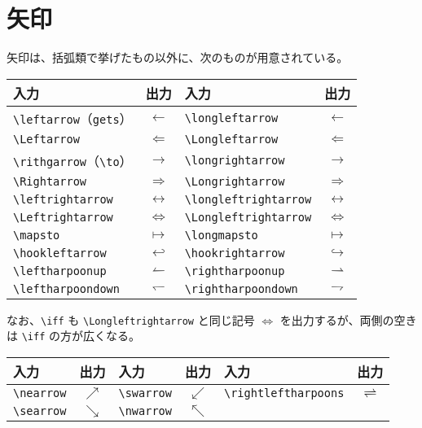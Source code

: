 \section{矢印}
矢印は、括弧類で挙げたもの以外に、次のものが用意されている。
\begin{longtable}{@{}lclc@{}}
    入力                             & 出力               & 入力                       & 出力                  \\ \toprule
    \verb`\leftarrow`（\verb`gets`） & $\leftarrow$       & \verb`\longleftarrow`      & $\longleftarrow$      \\
    \verb`\Leftarrow`                & $\Leftarrow$       & \verb`\Longleftarrow`      & $\Longleftarrow$      \\
    \verb`\rithgarrow`（\verb`\to`） & $\rightarrow$      & \verb`\longrightarrow`     & $\longrightarrow$     \\
    \verb`\Rightarrow`               & $\Rightarrow$      & \verb`\Longrightarrow`     & $\Longrightarrow$     \\
    \verb`\leftrightarrow`           & $\leftrightarrow$  & \verb`\longleftrightarrow` & $\longleftrightarrow$ \\
    \verb`\Leftrightarrow`           & $\Leftrightarrow$  & \verb`\Longleftrightarrow` & $\Longleftrightarrow$ \\
    \verb`\mapsto`                   & $\mapsto$          & \verb`\longmapsto`         & $\longmapsto$         \\
    \verb`\hookleftarrow`            & $\hookleftarrow$   & \verb`\hookrightarrow`     & $\hookrightarrow$     \\
    \verb`\leftharpoonup`            & $\leftharpoonup$   & \verb`\rightharpoonup`     & $\rightharpoonup$     \\
    \verb`\leftharpoondown`          & $\leftharpoondown$ & \verb`\rightharpoondown`   & $\rightharpoondown$   \\
\end{longtable}
なお、\verb`\iff` も \verb`\Longleftrightarrow` と同じ記号 $\iff$ を出力するが、両側の空きは \verb`\iff` の方が広くなる。
\begin{longtable}{@{}lclclc@{}}
  入力            & 出力       & 入力            & 出力       & 入力                      & 出力                 \\ \toprule
  \verb`\nearrow` & $\nearrow$ & \verb`\swarrow` & $\swarrow$ & \verb`\rightleftharpoons` & $\rightleftharpoons$ \\
  \verb`\searrow` & $\searrow$ & \verb`\nwarrow` & $\nwarrow$ &                           &                      \\
\end{longtable}
